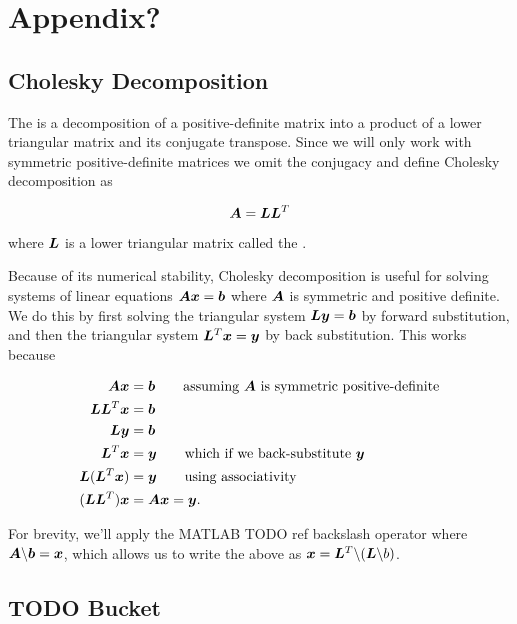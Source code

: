\chapter{Appendix?}

\section{Cholesky Decomposition}

\begin{defn}
    The  is a decomposition of a positive-definite matrix into a product of a lower triangular matrix and its conjugate transpose. Since we will only work with symmetric positive-definite matrices we omit the conjugacy and define Cholesky decomposition as

        \begin{equation}
            {\bm{A}} = {\bm{L}} {\bm{L}}^T
        \end{equation}
        
    where ${\bm{L}}$ is a lower triangular matrix called the .
\end{defn}

Because of its numerical stability, Cholesky decomposition is useful for solving systems of linear equations ${\bm{A}} {\bm{x}} = {\bm{b}}$ where ${\bm{A}}$ is symmetric and positive definite. We do this by first solving the triangular system ${\bm{L}} {\bm{y}} = {\bm{b}}$ by forward substitution, and then the triangular system ${\bm{L}}^T {\bm{x}} = {\bm{y}}$ by back substitution. This works because

\begin{align}
    {\bm{A}} {\bm{x}} &= {\bm{b}} \qquad \text{assuming ${\bm{A}}$ is symmetric positive-definite} \\
    {\bm{L}}{\bm{L}}^T {\bm{x}} &= {\bm{b}} \\
    {\bm{L}} {\bm{y}} &= {\bm{b}} \\
    {\bm{L}}^T {\bm{x}} &= {\bm{y}} \qquad \text{which if we back-substitute ${\bm{y}}$} \\
    {\bm{L}} ({\bm{L}}^T {\bm{x}}) &= {\bm{y}} \qquad \text{using associativity} \\
    ({\bm{L}} {\bm{L}}^T) {\bm{x}} &= {\bm{A}} {\bm{x}} = {\bm{y}}.
\end{align}

For brevity, we'll apply the MATLAB {TODO ref} backslash operator where ${\bm{A}} \backslash {\bm{b}} = {\bm{x}}$, which allows us to write the above as ${\bm{x}} = {\bm{L}}^T \backslash ({\bm{L}} \backslash b)$.


\section{TODO Bucket}


